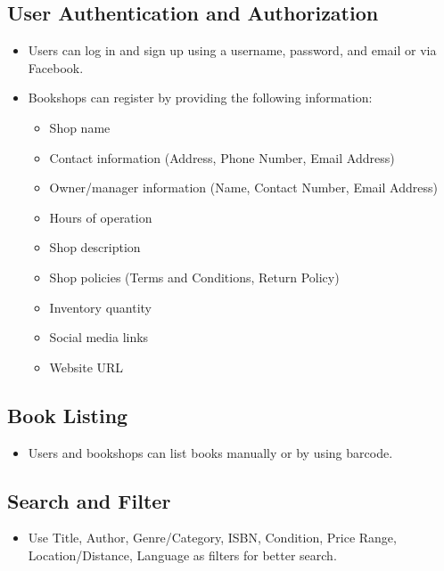 
\subsection{User Authentication and Authorization}
\begin{itemize}
  \item Users can log in and sign up using a username, password, and email or via Facebook.
  \item Bookshops can register by providing the following information:
  \begin{itemize}
    \item Shop name
    \item Contact information (Address, Phone Number, Email Address)
    \item Owner/manager information (Name, Contact Number, Email Address)
    \item Hours of operation
    \item Shop description
    \item Shop policies (Terms and Conditions, Return Policy)
    \item Inventory quantity
    \item Social media links
    \item Website URL
  \end{itemize}
\end{itemize}

\subsection{Book Listing}
\begin{itemize}
  \item Users and bookshops can list books manually or by using barcode.
\end{itemize}

\subsection{Search and Filter}
\begin{itemize}
  \item Use Title, Author, Genre/Category, ISBN, Condition, Price Range, Location/Distance, Language as filters for better search.
\end{itemize}

